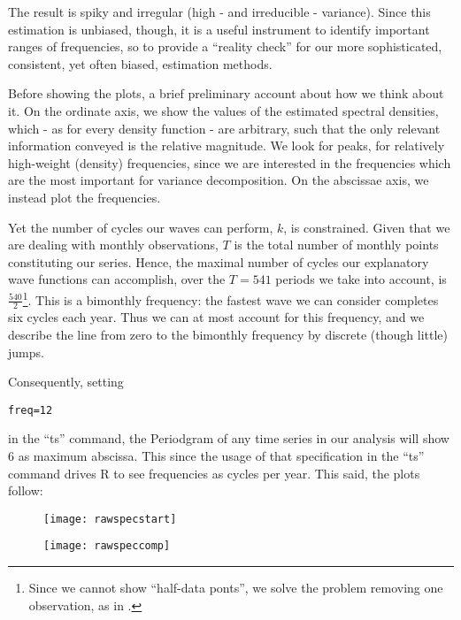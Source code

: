 \documentclass[12pt]{article} %
\begin{document}
The result is spiky and irregular (high - and irreducible - variance). Since this estimation is unbiased, though, it is a useful instrument to identify important ranges of frequencies, so to provide a ``reality check'' for our more sophisticated, consistent, yet often biased, estimation methods. 

Before showing the plots, a brief preliminary account about how we think about it. On the ordinate axis, we show the values of the estimated spectral densities, which - as for every density function - are arbitrary, such that the only relevant information conveyed is the relative magnitude. We look for peaks, for relatively high-weight (density) frequencies, since we are interested in the frequencies which are the most important for variance decomposition. On the abscissae axis, we instead plot the frequencies. 

Yet the number of cycles our waves can perform, $k$,  is constrained. Given that we are dealing with monthly observations, $T$ is the total number of monthly points constituting our series. Hence, the maximal number of cycles our explanatory wave functions can accomplish, over the $T=541$ periods we take into account, is $\frac{540}{2}$\footnote{Since we cannot show ``half-data ponts'', we solve the problem removing one observation, as in \citet{hammy}.}. This is a bimonthly frequency: the fastest wave we can consider completes six cycles each year. Thus we can at most account for this frequency, and we describe the line from zero to the bimonthly frequency by discrete (though little) jumps.

Consequently, setting 
\begin{verbatim}
freq=12
\end{verbatim} 
in the ``ts'' command, the Periodgram of any time series in our analysis will show 6 as maximum abscissa. This since the usage of that specification in the ``ts'' command drives R to see frequencies as cycles per year.
This said, the plots follow:

\begin{figure}[h!]
\begin{center}
\texttt{[image: rawspecstart]}
\caption{}
\end{center}
\end{figure}

\begin{figure}[h!]
\begin{center}
\texttt{[image: rawspeccomp]}
\caption{}
\end{center}
\end{figure}
\end{document}
